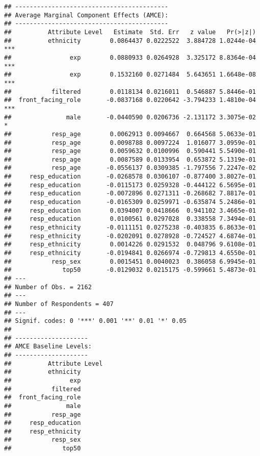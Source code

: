 \documentclass[
]{article}
\begin{document}
\begin{verbatim}
## ------------------------------------------
## Average Marginal Component Effects (AMCE):
## ------------------------------------------
##          Attribute Level   Estimate  Std. Err   z value   Pr(>|z|)    
##          ethnicity        0.0864437 0.0222522  3.884728 1.0244e-04 ***
##                exp        0.0880933 0.0264928  3.325172 8.8364e-04 ***
##                exp        0.1532160 0.0271484  5.643651 1.6648e-08 ***
##           filtered        0.0118134 0.0216011  0.546887 5.8446e-01    
##  front_facing_role       -0.0837168 0.0220642 -3.794233 1.4810e-04 ***
##               male       -0.0440590 0.0206736 -2.131172 3.3075e-02   *
##           resp_age        0.0062913 0.0094667  0.664568 5.0633e-01    
##           resp_age        0.0098788 0.0097224  1.016077 3.0959e-01    
##           resp_age        0.0059632 0.0100996  0.590441 5.5490e-01    
##           resp_age        0.0087589 0.0133954  0.653872 5.1319e-01    
##           resp_age       -0.0556137 0.0309385 -1.797556 7.2247e-02    
##     resp_education       -0.0268578 0.0306107 -0.877400 3.8027e-01    
##     resp_education       -0.0115173 0.0259328 -0.444122 6.5695e-01    
##     resp_education       -0.0072896 0.0271311 -0.268682 7.8817e-01    
##     resp_education       -0.0165309 0.0259971 -0.635874 5.2486e-01    
##     resp_education        0.0394007 0.0418666  0.941102 3.4665e-01    
##     resp_education        0.0100561 0.0297028  0.338558 7.3494e-01    
##     resp_ethnicity       -0.0111151 0.0275238 -0.403835 6.8633e-01    
##     resp_ethnicity       -0.0202091 0.0278928 -0.724527 4.6874e-01    
##     resp_ethnicity        0.0014226 0.0291532  0.048796 9.6108e-01    
##     resp_ethnicity       -0.0194841 0.0266974 -0.729813 4.6550e-01    
##           resp_sex        0.0015451 0.0040023  0.386058 6.9945e-01    
##              top50       -0.0129032 0.0215175 -0.599661 5.4873e-01    
## ---
## Number of Obs. = 2162
## ---
## Number of Respondents = 407
## ---
## Signif. codes: 0 '***' 0.001 '**' 0.01 '*' 0.05
## 
## --------------------
## AMCE Baseline Levels:
## --------------------
##          Attribute Level
##          ethnicity      
##                exp      
##           filtered      
##  front_facing_role      
##               male      
##           resp_age      
##     resp_education      
##     resp_ethnicity      
##           resp_sex      
##              top50
\end{verbatim}
\end{document}
